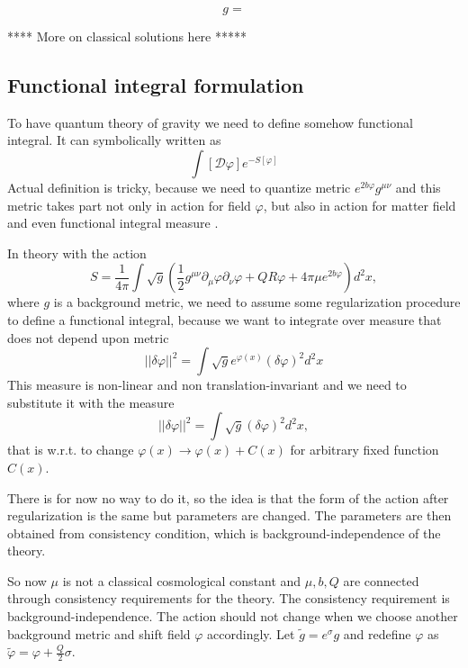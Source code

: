 \documentclass[12pt]{article}
\begin{document}
\begin{equation}
  \label{eq:89}
  g=
\end{equation}

**** More on classical solutions here *****

\subsection{Functional integral formulation}
\label{sec:funct-integr-form}

To have quantum theory of gravity we need to define somehow functional integral. It can symbolically
written as
\begin{equation}
  \label{eq:101}
  \int [\mathcal{D}\varphi] e^{-S[\varphi]}
\end{equation}
Actual definition is tricky, because we need to quantize metric $e^{2b\varphi}g^{\mu\nu}$ and this
metric takes part not only in action for field $\varphi$, but also in action for matter field and
even functional integral measure \cite{david1988conformal,distler1989conformal,polyakov1987gauge}. 

In theory with the action
$$S=\frac{1}{4\pi} \int \sqrt{g}\left( \frac{1}{2} g^{\mu\nu} \partial_{\mu} \varphi \partial_{\nu}
  \varphi + Q R\varphi + 4\pi\mu e^{2b\varphi}\right) d^{2}x,$$ 
where $g$ is a background metric, we need to assume some regularization procedure to define a
functional integral, because we want to integrate over measure that does not depend upon metric
\begin{equation}
  \label{eq:114}
  ||\delta\varphi||^{2}=\int \sqrt{g} e^{\varphi(x)}(\delta\varphi)^{2} d^{2}x
\end{equation}
This measure is non-linear and non translation-invariant and we need to substitute it with the
measure
\begin{equation}
  \label{eq:115}
    ||\delta\varphi||^{2}=\int \sqrt{g}(\delta\varphi)^{2} d^{2}x,
\end{equation}
that is  w.r.t. to change $\varphi(x)\to \varphi(x) +C(x)$ for arbitrary fixed function $C(x)$. 

There is for now no way to do it, so 
the idea is that the form of the action after regularization is the same but parameters are changed.
The parameters are then obtained from consistency condition, which is background-independence of the
theory. 

So now $\mu$ is not a classical cosmological constant and $\mu,b,Q$ are connected through
consistency requirements for the theory. 
The consistency requirement is background-independence. The action should not change when we choose
another background metric and shift field $\varphi$ accordingly. 
Let $\tilde g = e^{\sigma} g$ and redefine $\varphi$ as $\tilde \varphi=\varphi +
\frac{Q}{2}\sigma$. 
\end{document}
